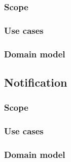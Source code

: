 \subsubsection{Scope}
\subsubsection{Use cases}
\subsubsection{Domain model}
\subsection{Notification}
\subsubsection{Scope}
\subsubsection{Use cases}
\subsubsection{Domain model}
